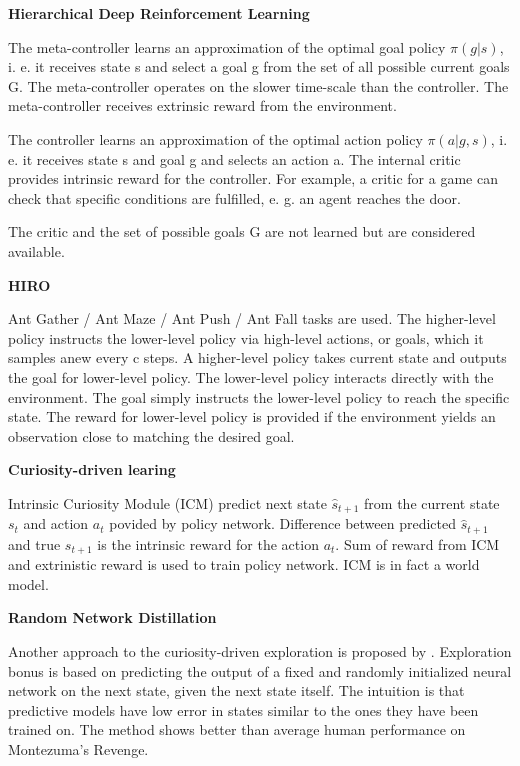 \documentclass{article}
\begin{document}
\textbf{Hierarchical Deep Reinforcement Learning}~\citep{Kulkarni2016HierarchicalDR}

The meta-controller learns an approximation of the optimal goal policy $\pi(g|s)$, i. e. it receives state s and select a goal g from the set of all possible current goals G. The meta-controller operates on the slower time-scale than the controller. The meta-controller receives extrinsic reward from the environment.

The controller learns an approximation of the optimal action policy $\pi(a|g,s)$, i. e. it receives state s and goal g and selects an action a. The internal critic provides intrinsic reward for the controller. For example, a critic for a game can check that specific conditions are fulfilled, e. g. an agent reaches the door.

The critic and the set of possible goals G are not learned but are considered available.

\textbf{HIRO}~\citep{Nachum2018DataEfficientHR}

Ant Gather / Ant Maze / Ant Push / Ant Fall tasks are used. The higher-level policy instructs the lower-level policy via high-level actions, or goals, which it samples anew every c steps. A higher-level policy takes current state and outputs the goal for lower-level policy. The lower-level policy interacts directly with the environment. The goal simply instructs the lower-level policy to reach the specific state. The reward for lower-level policy is provided if the environment yields an observation close to matching the desired goal.

\textbf{Curiosity-driven learing}~\citep{Pathak2017CuriosityDrivenEB}

Intrinsic Curiosity Module (ICM) predict next state $\hat{s}_{t+1}$ from the current state $s_t$ and action $a_t$ povided by policy network. Difference between predicted $\hat{s}_{t+1}$ and true $s_{t+1}$ is the intrinsic reward for the action $a_t$. Sum of reward from ICM and extrinistic reward is used to train policy network. ICM is in fact a world model.

\textbf{Random Network Distillation}

Another approach to the curiosity-driven exploration is proposed by \citep{Burda2019ExplorationBR}. Exploration bonus is based on predicting the output of a fixed and randomly initialized neural network on the next state, given the next state itself. The intuition is that predictive models have low error in states similar to the ones they have been trained on. The method shows better than average human performance on Montezuma’s Revenge.
\end{document}
